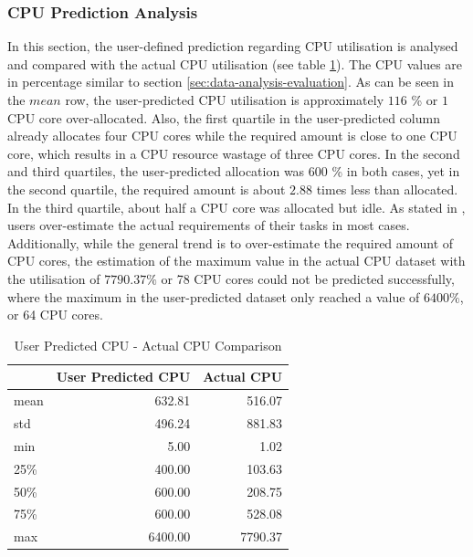       \subsubsection{CPU Prediction Analysis}
      \label{sec:user-defined-cpu-prediction-analysis-evaluation-scenario}

        In this section, the user-defined prediction regarding CPU utilisation is analysed and compared with the actual CPU utilisation (see table \ref{tab:user-predicted-cpu-comparison}).
        The CPU values are in percentage similar to section \ref{sec:data-analysis-evaluation}.
        As can be seen in the $mean$ row, the user-predicted CPU utilisation is approximately $116$ \% or $1$ CPU core over-allocated. 
        Also, the first quartile in the user-predicted column already allocates four CPU cores while the required amount is close to one CPU core, which results in a CPU resource wastage of three CPU cores.
        In the second and third quartiles, the user-predicted allocation was 600 \% in both cases, yet in the second quartile, the required amount is about $2.88$ times less than allocated.
        In the third quartile, about half a CPU core was allocated but idle.
        As stated in \cite{thonglekImprovingResourceUtilization2019}, users over-estimate the actual requirements of their tasks in most cases.
        Additionally, while the general trend is to over-estimate the required amount of CPU cores, the estimation of the maximum value in the actual CPU dataset with the utilisation of $7790.37 \%$ or 78 CPU cores could not be predicted successfully, where the maximum in the user-predicted dataset only reached a value of $6400\%$, or 64 CPU cores.
        \begin{table}
          \centering
          \caption{User Predicted CPU - Actual CPU Comparison}
          \label{tab:user-predicted-cpu-comparison}

          \begin{tabular}{|l|rr|}
            \toprule
            {} &  User Predicted CPU &  Actual CPU \\
            \midrule
            mean       &         632.81 &     516.07 \\
            std        &         496.24 &     881.83 \\
            min        &           5.00 &       1.02 \\
            25\%        &         400.00 &     103.63 \\
            50\%        &         600.00 &     208.75 \\
            75\%        &         600.00 &     528.08 \\
            max        &        6400.00 &    7790.37 \\
            \bottomrule
            \end{tabular}
        \end{table}
